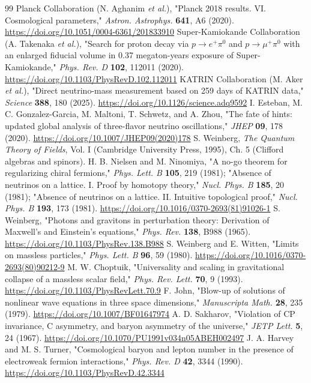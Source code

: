 \documentclass[aps,prd,amsmath,amssymb,superscriptaddress,longbibliography,floatfix,preprint]{revtex4-2}
\begin{document}
\begin{thebibliography}{99}
 Planck Collaboration (N. Aghanim \emph{et al.}), "Planck 2018 results. VI. Cosmological parameters," \emph{Astron. Astrophys.} \textbf{641}, A6 (2020). \url{https://doi.org/10.1051/0004-6361/201833910}
 Super-Kamiokande Collaboration (A. Takenaka \emph{et al.}), "Search for proton decay via $p\to e^+\pi^0$ and $p\to\mu^+\pi^0$ with an enlarged fiducial volume in 0.37 megaton-years exposure of Super-Kamiokande," \emph{Phys. Rev. D} \textbf{102}, 112011 (2020). \url{https://doi.org/10.1103/PhysRevD.102.112011}
 KATRIN Collaboration (M. Aker \emph{et al.}), "Direct neutrino-mass measurement based on 259 days of KATRIN data," \emph{Science} \textbf{388}, 180 (2025). \url{https://doi.org/10.1126/science.adq9592}
 I. Esteban, M. C. Gonzalez-Garcia, M. Maltoni, T. Schwetz, and A. Zhou, "The fate of hints: updated global analysis of three-flavor neutrino oscillations," \emph{JHEP} \textbf{09}, 178 (2020). \url{https://doi.org/10.1007/JHEP09(2020)178}
 S. Weinberg, \emph{The Quantum Theory of Fields}, Vol. I (Cambridge University Press, 1995), Ch. 5 (Clifford algebras and spinors).
 H. B. Nielsen and M. Ninomiya, "A no-go theorem for regularizing chiral fermions," \emph{Phys. Lett. B} \textbf{105}, 219 (1981); "Absence of neutrinos on a lattice. I. Proof by homotopy theory," \emph{Nucl. Phys. B} \textbf{185}, 20 (1981); "Absence of neutrinos on a lattice. II. Intuitive topological proof," \emph{Nucl. Phys. B} \textbf{193}, 173 (1981). \url{https://doi.org/10.1016/0370-2693(81)91026-1}
 S. Weinberg, "Photons and gravitons in perturbation theory: Derivation of Maxwell's and Einstein's equations," \emph{Phys. Rev.} \textbf{138}, B988 (1965). \url{https://doi.org/10.1103/PhysRev.138.B988}
 S. Weinberg and E. Witten, "Limits on massless particles," \emph{Phys. Lett. B} \textbf{96}, 59 (1980). \url{https://doi.org/10.1016/0370-2693(80)90212-9}
 M. W. Choptuik, "Universality and scaling in gravitational collapse of a massless scalar field," \emph{Phys. Rev. Lett.} \textbf{70}, 9 (1993). \url{https://doi.org/10.1103/PhysRevLett.70.9}
 F. John, "Blow-up of solutions of nonlinear wave equations in three space dimensions," \emph{Manuscripta Math.} \textbf{28}, 235 (1979). \url{https://doi.org/10.1007/BF01647974}
 A. D. Sakharov, "Violation of CP invariance, C asymmetry, and baryon asymmetry of the universe," \emph{JETP Lett.} \textbf{5}, 24 (1967). \url{https://doi.org/10.1070/PU1991v034n05ABEH002497}
 J. A. Harvey and M. S. Turner, "Cosmological baryon and lepton number in the presence of electroweak fermion interactions," \emph{Phys. Rev. D} \textbf{42}, 3344 (1990). \url{https://doi.org/10.1103/PhysRevD.42.3344}

\end{thebibliography}
\end{document}
